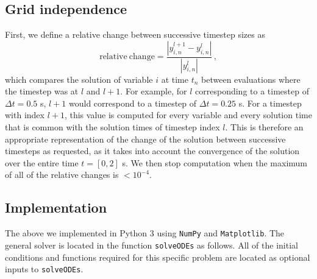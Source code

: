 \documentclass{article}
\begin{document}
\subsection*{Grid independence}

First, we define a relative change between successive timestep sizes as
\[
	\mathrm{relative~change} = \frac{|y_{i,n}^{l+1} - y_{i,n}^l|}{|y_{i,n}^l|}\,,
\]
which compares the solution of variable $i$ at time $t_n$ between evaluations where the timestep was at $l$ and $l+1$. For example, for $l$ corresponding to a timestep of $\Delta t = 0.5$ s, $l + 1$ would correspond to a timestep of $\Delta t = 0.25$ s. For a timestep with index $l + 1$, this value is computed for every variable and every solution time that is common with the solution times of timestep index $l$. This is therefore an appropriate representation of the change of the solution between successive timesteps as requested, as it takes into account the convergence of the solution over the entire time $t = [0, 2]$ s. We then stop computation when the maximum of all of the relative changes is $< 10^{-4}$.
\subsection*{Implementation}

The above we implemented in Python 3 using \texttt{NumPy} and \texttt{Matplotlib}. The general solver is located in the function \texttt{solveODEs} as follows. All of the initial conditions and functions required for this specific problem are located as optional inputs to \texttt{solveODEs}.
\end{document}
